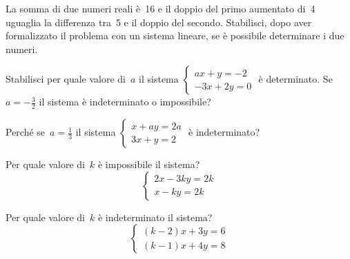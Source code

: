 \begin{esercizio}
 \label{ese:22.34}
La somma di due numeri reali è~16 e il doppio del
primo aumentato di~4 uguaglia la differenza tra~5 e il doppio del
secondo. Stabilisci, dopo aver formalizzato il problema con un sistema
lineare, se è possibile determinare i due numeri.
\end{esercizio}

\begin{esercizio}
 \label{ese:22.35}
Stabilisci per quale valore di~\(a\) il sistema
\(\left\{\begin{array}{l}ax+y=-2\\-3x+2y=0\end{array}\right.\) è
determinato. Se~\(a=-{\frac{3}{2}}\) il sistema è indeterminato o
impossibile?
\end{esercizio}

\begin{esercizio}
 \label{ese:22.36}
Perché se~\(a=\frac{1}{3}\) il sistema
\(\left\{\begin{array}{l}x+ay=2a\\3x+y=2\end{array}\right.\) è
indeterminato?
\end{esercizio}

\begin{esercizio}
 \label{ese:22.37}
Per quale valore di~\(k\) è impossibile il sistema?
\[\left\{\begin{array}{l}2x-3ky=2k\\x-ky=2k \end{array}\right.\]
\end{esercizio}

\begin{esercizio}
 \label{ese:22.38}
Per quale valore di~\(k\) è indeterminato il sistema?
\[\left\{\begin{array}{l}(k-2)x+3y=6 \\(k-1)x+4y=8 \end{array}\right.\]
\end{esercizio}

